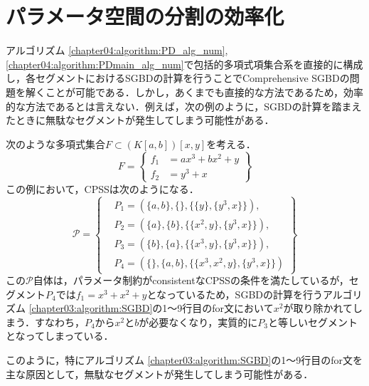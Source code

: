 \section{パラメータ空間の分割の効率化}
アルゴリズム \ref{chapter04:algorithm:PD_alg_num}, \ref{chapter04:algorithm:PDmain_alg_num}で包括的多項式項集合系を直接的に構成し，各セグメントにおけるSGBDの計算を行うことでComprehensive SGBDの問題を解くことが可能である．しかし，あくまでも直接的な方法であるため，効率的な方法であるとは言えない．例えば，次の例のように，SGBDの計算を踏まえたときに無駄なセグメントが発生してしまう可能性がある．
\begin{example}
	次のような多項式集合$F \subset (K[a, b])[x, y]$を考える．
	\begin{equation*}
		F = \left\{
			\begin{aligned}
				f_1 &= ax^3 + bx^2 + y \\
				f_2 &= y^3 + x
			\end{aligned}
		\right\}
	\end{equation*}
	この例において，CPSSは次のようになる．
	\begin{equation*}
		\mathcal{P} = 
		\left\{
			\begin{aligned}
				&P_1 = \left( \{a, b\}, \{\}, \{ \{y\}, \{y^3, x\} \} \right), \\
				&P_2 = \left( \{a\}, \{b\}, \{ \{x^2, y\}, \{y^3, x\} \} \right), \\
				&P_3 = \left( \{b\}, \{a\}, \{ \{x^3, y\}, \{y^3, x\} \} \right), \\
				&P_4 = \left( \{\}, \{a, b\}, \{ \{x^3, x^2, y\}, \{y^3, x\} \} \right)
			\end{aligned}
		\right\}
	\end{equation*}
	この$\mathcal{P}$自体は，パラメータ制約がconsistentなCPSSの条件を満たしているが，セグメント$P_4$では$f_1 = x^3 + x^2 + y$となっているため，SGBDの計算を行うアルゴリズム \ref{chapter03:algorithm:SGBD}の1〜9行目のfor文において$x^2$が取り除かれてしまう．すなわち，$P_4$から$x^2$と$b$が必要なくなり，実質的に$P_3$と等しいセグメントとなってしまっている．
\end{example}
このように，特にアルゴリズム \ref{chapter03:algorithm:SGBD}の1〜9行目のfor文を主な原因として，無駄なセグメントが発生してしまう可能性がある．

